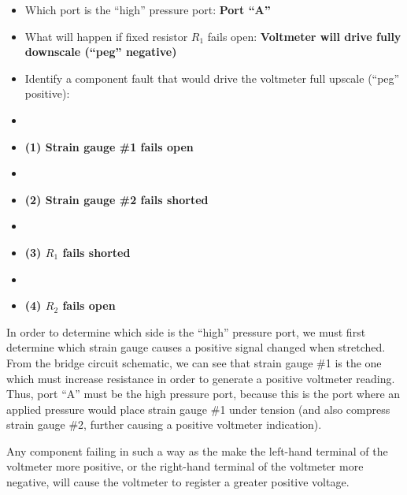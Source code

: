 \begin{itemize}
\item{} Which port is the ``high'' pressure port: {\bf Port ``A''}
\item{} What will happen if fixed resistor $R_1$ fails open: {\bf Voltmeter will drive fully downscale (``peg'' negative)}
\item{} Identify a component fault that would drive the voltmeter full upscale (``peg'' positive):
\item\item{} {\bf (1) Strain gauge \#1 fails open} 
\item\item{} {\bf (2) Strain gauge \#2 fails shorted} 
\item\item{} {\bf (3) $R_1$ fails shorted}
\item\item{} {\bf (4) $R_2$ fails open}
\end{itemize}

\vskip 10pt

In order to determine which side is the ``high'' pressure port, we must first determine which strain gauge causes a positive signal changed when stretched.  From the bridge circuit schematic, we can see that strain gauge \#1 is the one which must increase resistance in order to generate a positive voltmeter reading.  Thus, port ``A'' must be the high pressure port, because this is the port where an applied pressure would place strain gauge \#1 under tension (and also compress strain gauge \#2, further causing a positive voltmeter indication).

\vskip 10pt

Any component failing in such a way as the make the left-hand terminal of the voltmeter more positive, or the right-hand terminal of the voltmeter more negative, will cause the voltmeter to register a greater positive voltage.



